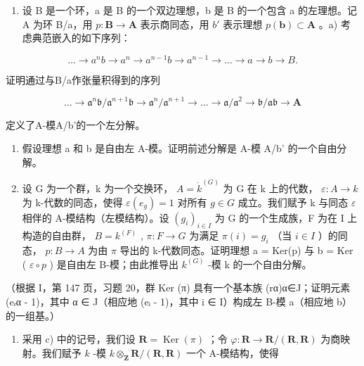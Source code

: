 \begin{enumerate}
\def\labelenumi{\arabic{enumi})}
\setcounter{enumi}{2}
\tightlist
\item
  设 B 是一个环，a 是 B 的一个双边理想，b 是 B 的一个包含 a 的左理想。记 A 为环 B/a，用 \(p: \mathbf{B} \to \mathbf{A}\) 表示商同态，用 \(b'\) 表示理想 \(p(\mathbf{b}) \subset \mathbf{A}\) 。a) 考虑典范嵌入的如下序列：
\end{enumerate}

\[
\dots \rightarrow a ^ {n} b \rightarrow a ^ {n} \rightarrow a ^ {n - 1} b \rightarrow a ^ {n - 1} \rightarrow \dots \rightarrow a \rightarrow b \rightarrow B.
\]

证明通过与B/a作张量积得到的序列

\[
\dots \rightarrow \mathfrak {a} ^ {n} \mathfrak {b} / \mathfrak {a} ^ {n + 1} \mathfrak {b} \rightarrow \mathfrak {a} ^ {n} / \mathfrak {a} ^ {n + 1} \rightarrow \dots \rightarrow \mathfrak {a} / \mathfrak {a} ^ {2} \rightarrow \mathfrak {b} / \mathfrak {a b} \rightarrow \mathbf {A}
\]

定义了A-模A/b'的一个左分解。

\begin{enumerate}
\def\labelenumi{\alph{enumi})}
\setcounter{enumi}{1}
\item
  假设理想 a 和 b 是自由左 A-模。证明前述分解是 A-模 A/b' 的一个自由分解。
\item
  设 G 为一个群，k 为一个交换环， \(A = \dot{k}^{(G)}\) 为 G 在 k 上的代数， \(\varepsilon : A \to k\) 为 k-代数的同态，使得 \(\varepsilon(e_g) = 1\) 对所有 \(g \in G\) 成立。我们赋予 k 与同态 \(\varepsilon\) 相伴的 A-模结构（左模结构）。设 \((g_i)_{i \in I}\) 为 G 的一个生成族，F 为在 I 上构造的自由群， \(B = k^{(F)}\) , \(\pi : F \to G\) 为满足 \(\pi(i) = g_i\) （当 \(i \in I\) ）的同态， \(p : B \to A\) 为由 \(\pi\) 导出的 k-代数同态。证明理想 a = Ker(p) 与 b = Ker ( \(\varepsilon \circ p\) ) 是自由左 B-模；由此推导出 \(k^{(G)}\) -模 k 的一个自由分解。
\end{enumerate}

（根据 I，第 147 页，习题 20，群 Ker (π) 具有一个基本族 (rα)α∈J；证明元素 (eᵣα - 1)，其中 α ∈ J（相应地 (eᵢ - 1)，其中 i ∈ I）构成左 B-模 a（相应地 b）的一组基。）

\begin{enumerate}
\def\labelenumi{\alph{enumi})}
\setcounter{enumi}{3}
\tightlist
\item
  采用 c) 中的记号，我们设 \(\mathbf{R} = \operatorname{Ker}(\pi)\) ；令 \(\varphi: \mathbf{R} \to \mathbf{R}/(\mathbf{R}, \mathbf{R})\) 为商映射。我们赋予 \(k\) -模 \(k \otimes_{\mathbf{Z}} \mathbf{R}/(\mathbf{R}, \mathbf{R})\) 一个 A-模结构，使得
\end{enumerate}

